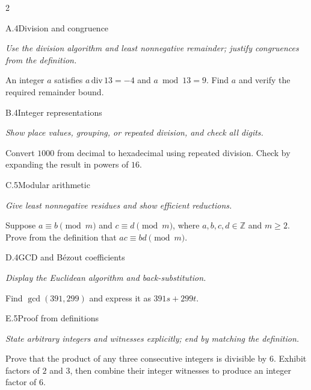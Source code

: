 \documentclass[9pt]{extarticle}
\begin{document}
\begin{multicols}{2}
\begin{CoreProblem}{A.4}{Division and congruence}
{\scriptsize\textit{Use the division algorithm and least nonnegative remainder; justify congruences from the definition.}\par}
An integer $a$ satisfies $a\,\mathrm{div}\,13=-4$ and $a\bmod13=9$.
Find $a$ and verify the required remainder bound.
\end{CoreProblem}
\begin{CoreProblem}{B.4}{Integer representations}
{\scriptsize\textit{Show place values, grouping, or repeated division, and check all digits.}\par}
Convert $1000$ from decimal to hexadecimal using repeated division. Check by
expanding the result in powers of $16$.
\end{CoreProblem}
\begin{CoreProblem}{C.5}{Modular arithmetic}
{\scriptsize\textit{Give least nonnegative residues and show efficient reductions.}\par}
Suppose $a\equiv b\pmod m$ and $c\equiv d\pmod m$, where
$a,b,c,d\in\mathbb Z$ and $m\ge2$. Prove from the definition that
$ac\equiv bd\pmod m$.
\end{CoreProblem}
\columnbreak
\begin{CoreProblem}{D.4}{GCD and B\'ezout coefficients}
{\scriptsize\textit{Display the Euclidean algorithm and back-substitution.}\par}
Find $\gcd(391,299)$ and express it as $391s+299t$.
\end{CoreProblem}
\begin{CoreProblem}{E.5}{Proof from definitions}
{\scriptsize\textit{State arbitrary integers and witnesses explicitly; end by matching the definition.}\par}
Prove that the product of any three consecutive integers is divisible by $6$.
Exhibit factors of $2$ and $3$, then combine their integer witnesses to
produce an integer factor of $6$.
\end{CoreProblem}
\end{multicols}
\CoreWorkArea
\FormBreak
{}
\end{document}
